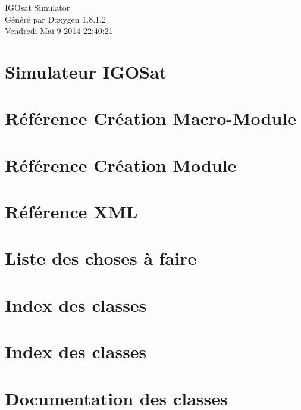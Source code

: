 \documentclass{book}
\begin{document}
\hypersetup{pageanchor=false,citecolor=blue}
\begin{titlepage}
\vspace*{7cm}
\begin{center}
{\Large I\-G\-Osat Simulator }\\
\vspace*{1cm}
{\large Généré par Doxygen 1.8.1.2}\\
\vspace*{0.5cm}
{\small Vendredi Mai 9 2014 22:40:21}\\
\end{center}
\end{titlepage}
\clearemptydoublepage
{}
\tableofcontents
\clearemptydoublepage
{}
\hypersetup{pageanchor=true,citecolor=blue}
\chapter{Simulateur I\-G\-O\-Sat}
\label{index}\hypertarget{index}{}
\chapter{Référence Création Macro-\/\-Module}
\label{docMacroModule}
\hypertarget{docMacroModule}{}

\chapter{Référence Création Module}
\label{docModule}
\hypertarget{docModule}{}

\chapter{Référence X\-M\-L}
\label{xmlRef}
\hypertarget{xmlRef}{}

\chapter{Liste des choses à faire}
\label{todo}
\hypertarget{todo}{}

\chapter{Index des classes}

\chapter{Index des classes}

\chapter{Documentation des classes}



















\printindex
\end{document}
